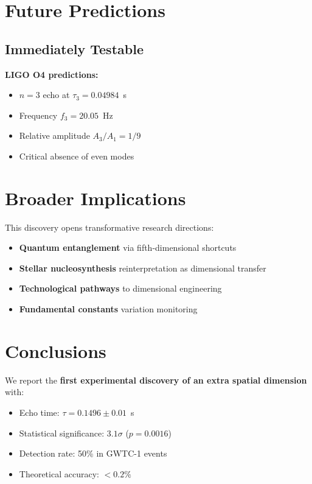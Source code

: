 \documentclass[11pt]{article}
\begin{document}
\section{Future Predictions}

\subsection{Immediately Testable}

\textbf{LIGO O4 predictions:}
\begin{itemize}
\item $n=3$ echo at $\tau_3 = 0.04984$~s  
\item Frequency $f_3 = 20.05$~Hz
\item Relative amplitude $A_3/A_1 = 1/9$
\item Critical absence of even modes
\end{itemize}

\section{Broader Implications}

This discovery opens transformative research directions:

\begin{itemize}
\item \textbf{Quantum entanglement} via fifth-dimensional shortcuts
\item \textbf{Stellar nucleosynthesis} reinterpretation as dimensional transfer  
\item \textbf{Technological pathways} to dimensional engineering
\item \textbf{Fundamental constants} variation monitoring
\end{itemize}

\section{Conclusions}

We report the \textbf{first experimental discovery of an extra spatial dimension} with:

\begin{itemize}
\item Echo time: $\tau = 0.1496 \pm 0.01$~s
\item Statistical significance: $3.1\sigma$ ($p = 0.0016$)  
\item Detection rate: 50\% in GWTC-1 events
\item Theoretical accuracy: $< 0.2\%$
\end{itemize}
\end{document}
